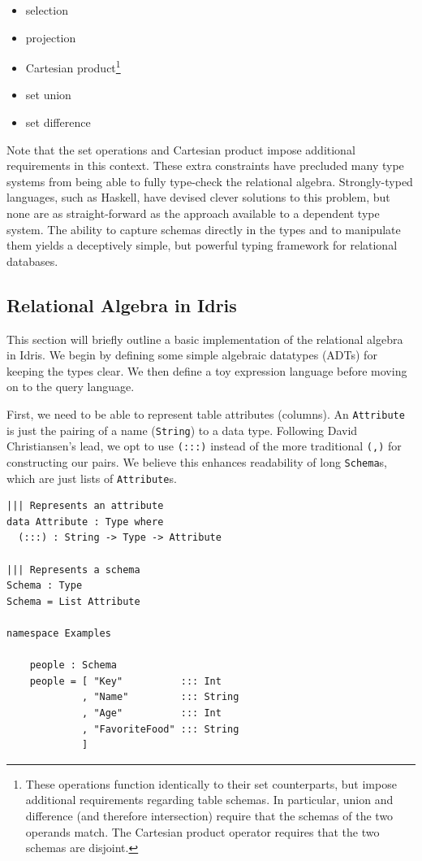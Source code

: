 \documentclass[12pt]{article}
\begin{document}
\begin{itemize}
    \item selection
    \item projection
    \item Cartesian product\footnote{\label{fn:set_ops} These operations function identically to their set counterparts, but impose additional requirements regarding table schemas. In particular, union and difference (and therefore intersection) require that the schemas of the two operands match. The Cartesian product operator requires that the two schemas are disjoint.}
    \item set union\footnotemark[\ref{fn:set_ops}]
    \item set difference\footnotemark[\ref{fn:set_ops}]
\end{itemize}

Note that the set operations and Cartesian product impose additional requirements in this context.
These extra constraints have precluded many type systems from being able to fully type-check the relational algebra.
Strongly-typed languages, such as Haskell, have devised clever solutions to this problem, but none are as straight-forward as the approach available to a dependent type system.
The ability to capture schemas directly in the types and to manipulate them yields a deceptively simple, but powerful typing framework for relational databases.

\subsection{Relational Algebra in Idris}

This section will briefly outline a basic implementation of the relational algebra in Idris.
We begin by defining some simple algebraic datatypes (ADTs) for keeping the types clear.
We then define a toy expression language before moving on to the query language.

First, we need to be able to represent table attributes (columns).
An \texttt{Attribute} is just the pairing of a name (\texttt{String}) to a data type.
Following David Christiansen's lead, we opt to use \texttt{(:::)} instead of the more traditional \texttt{(,)} for constructing our pairs\cite{ChristiansenTypeProviders}.
We believe this enhances readability of long \texttt{Schema}s, which are just lists of \texttt{Attribute}s.

\begin{lstlisting}[caption={Representing attributes and schemas},label={lst:attrs_and_schemas}]
||| Represents an attribute
data Attribute : Type where
  (:::) : String -> Type -> Attribute

||| Represents a schema
Schema : Type
Schema = List Attribute

namespace Examples

    people : Schema
    people = [ "Key"          ::: Int
             , "Name"         ::: String
             , "Age"          ::: Int
             , "FavoriteFood" ::: String
             ]
\end{lstlisting}
\end{document}
